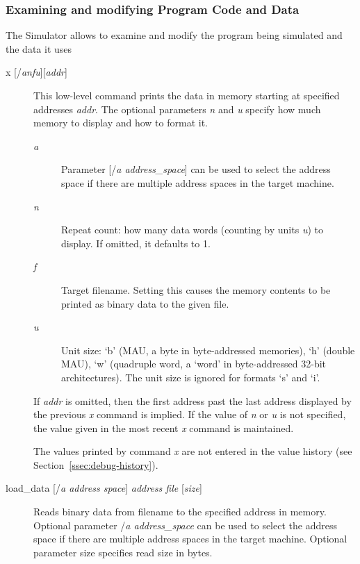 \documentclass[a4paper,twoside]{tceusermanual}
\begin{document}
\subsubsection{Examining and modifying Program Code and Data}
\label{ssec:debug-data}

The Simulator allows to examine and modify the program being simulated and
the data it uses

\begin{description}
\item[x {[/\emph{anfu}][\emph{addr}]}] %
  This low-level command prints the data in memory starting at specified
  addresses \emph{addr}.  The optional parameters \emph{n} and
  \emph{u} specify how much memory to display and how to format it.
  \begin{description}
  \item[\emph{a}] %
    Parameter [/\emph{a address\_space}] can be used to select the address
    space if there are multiple address spaces in the target machine.
  \item[\emph{n}] %
    Repeat count: how many data words (counting by units \emph{u}) to
    display.  If omitted, it defaults to 1.
  \item[\emph{f}] %
    Target filename. Setting this causes the memory contents to be printed 
    as binary data to the given file.
  \item[\emph{u}] %
    Unit size: `b' (MAU, a byte in byte-addressed memories), `h' (double
    MAU), `w' (quadruple word, a `word' in byte-addressed 32-bit
    architectures).  The unit size is ignored for formats `s' and `i'.
  \end{description}

  If \emph{addr} is omitted, then the first address past the last address
  displayed by the previous \emph{x} command is implied.  If the value of
  \emph{n} or \emph{u} is not specified, the value given in the
  most recent \emph{x} command is maintained.

  The values printed by command \emph{x} are not entered in the value
  history (see Section~\ref{ssec:debug-history}).

\item[load\_data {[/\emph{a address space}] \emph{address file }[\emph{size}]}] %

  Reads binary data from filename to the specified address in memory.
  Optional parameter /\emph{a address\_space} can be used to select the address
  space if there are multiple address spaces in the target machine.
  Optional parameter size specifies read size in bytes.


\end{description}
\end{document}
